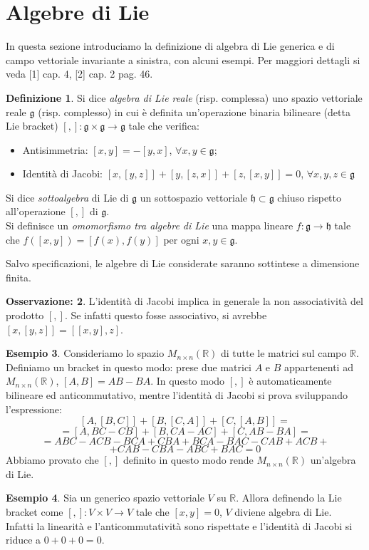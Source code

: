 \documentclass[12pt,a4paper]{report}
\theoremstyle{definition}
\newtheorem{Def}{Definizione}[chapter]
\theoremstyle{Theorem}
\theoremstyle{definition}
\newtheorem{Ex}[Def]{Esempio}
\theoremstyle{definition}
\theoremstyle{definition}
\newtheorem{Obs}[Def]{Osservazione:}
\begin{document}
\section{Algebre di Lie}
In questa sezione introduciamo la definizione di algebra di Lie generica e di campo vettoriale invariante a sinistra, con alcuni esempi. Per maggiori dettagli si veda [1] cap. 4, [2] cap. 2 pag. 46.
\begin{Def}
	Si dice \textit{algebra di Lie reale} (risp. complessa) uno spazio vettoriale reale $\mathfrak{g}$ (risp. complesso) in cui è definita un'operazione binaria bilineare (detta Lie bracket) $[,]:\mathfrak{g}\times\mathfrak{g}\rightarrow\mathfrak{g}$ tale che verifica:
	\begin{itemize}
		\item Antisimmetria: $[x,y]=-[y,x]$, $\forall x,y\in\mathfrak{g}$;
		\item Identità di Jacobi: $[x,[y,z]]+[y,[z,x]]+[z,[x,y]]=0$, $\forall x,y,z\in \mathfrak{g}$ 
	\end{itemize}
	Si dice \textit{sottoalgebra} di Lie di $\mathfrak{g}$ un sottospazio vettoriale $\mathfrak{h}\subset\mathfrak{g}$ chiuso rispetto all'operazione $[,]$ di $\mathfrak{g}$.\\
		Si definisce un \textit{omomorfismo tra algebre di Lie} una mappa lineare $f:\mathfrak{g}\rightarrow\mathfrak{h}$ tale che $f([x,y])=[f(x),f(y)]$ per ogni $x,y\in\mathfrak{g}$.
\end{Def}
Salvo specificazioni, le algebre di Lie considerate saranno sottintese a dimensione finita.
\begin{Obs}
	L'identità di Jacobi implica in generale la non associatività del prodotto $[,]$. Se infatti questo fosse associativo, si avrebbe $[x,[y,z]]=[[x,y],z]$.
\end{Obs}
\begin{Ex} \label{Obs: bracket Mnn}
	Consideriamo lo spazio $M_{n\times n}(\mathbb{R})$ di tutte le matrici sul campo $\mathbb{R}$. Definiamo un bracket in questo modo: prese due matrici $A$ e $B$ appartenenti ad $M_{n\times n}(\mathbb{R})$, $[A,B]=AB-BA$. In questo modo $[,]$ è automaticamente bilineare ed anticommutativo, mentre l'identità di Jacobi si prova sviluppando l'espressione:
	$$[A,[B,C]]+[B,[C,A]]+[C,[A,B]]=$$
	$$=[A,BC-CB]+[B,CA-AC]+[C,AB-BA]=$$
	$$=ABC-ACB-BCA+CBA+BCA-BAC-CAB+ACB+$$
	$$+CAB-CBA-ABC+BAC=0$$
	Abbiamo provato che $[,]$ definito in questo modo rende $M_{n\times n}(\mathbb{R})$ un'algebra di Lie.
\end{Ex}
\begin{Ex}
	Sia un generico spazio vettoriale $V$ su $\mathbb{R}$. Allora definendo la Lie bracket come $[,]:V\times V\rightarrow V$ tale che $[x,y]=0$, $V$ diviene algebra di Lie.\\
	Infatti la linearità e l'anticommutatività sono rispettate e l'identità di Jacobi si riduce a $0+0+0=0$.
\end{Ex}
\end{document}
